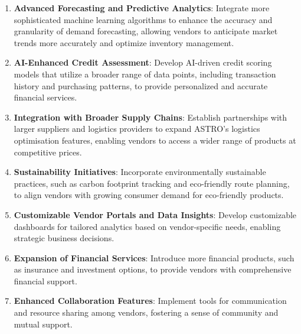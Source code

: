 \begin{enumerate}
    \item \textbf{Advanced Forecasting and Predictive Analytics}: Integrate more sophisticated machine learning algorithms to enhance the accuracy and granularity of demand forecasting, allowing vendors to anticipate market trends more accurately and optimize inventory management.
    \item \textbf{AI-Enhanced Credit Assessment}: Develop AI-driven credit scoring models that utilize a broader range of data points, including transaction history and purchasing patterns, to provide personalized and accurate financial services.
    \item \textbf{Integration with Broader Supply Chains}: Establish partnerships with larger suppliers and logistics providers to expand ASTRO's logistics optimisation features, enabling vendors to access a wider range of products at competitive prices.
    \item \textbf{Sustainability Initiatives}: Incorporate environmentally sustainable practices, such as carbon footprint tracking and eco-friendly route planning, to align vendors with growing consumer demand for eco-friendly products.
    \item \textbf{Customizable Vendor Portals and Data Insights}: Develop customizable dashboards for tailored analytics based on vendor-specific needs, enabling strategic business decisions.
    \item \textbf{Expansion of Financial Services}: Introduce more financial products, such as insurance and investment options, to provide vendors with comprehensive financial support.
    \item \textbf{Enhanced Collaboration Features}: Implement tools for communication and resource sharing among vendors, fostering a sense of community and mutual support.


\end{enumerate}

